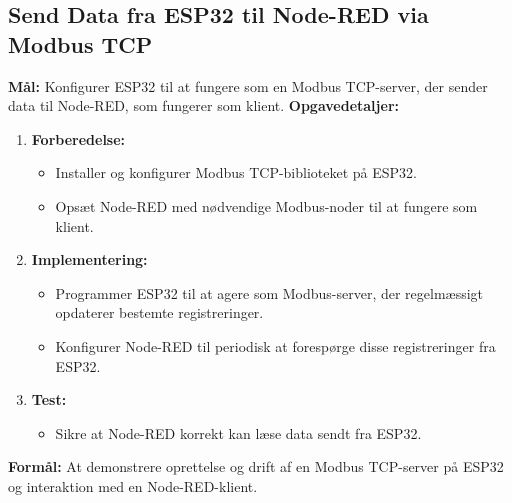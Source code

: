 \documentclass[12pt,a4paper]{book}
\begin{document}
	\subsection*{Send Data fra ESP32 til Node-RED via Modbus TCP}
	\textbf{Mål:} Konfigurer ESP32 til at fungere som en Modbus TCP-server, der sender data til Node-RED, som fungerer som klient.
	\newline\newline\noindent
	\textbf{Opgavedetaljer:}
	\begin{enumerate}
		\item \textbf{Forberedelse:}
		\begin{itemize}
			\item Installer og konfigurer Modbus TCP-biblioteket på ESP32.
			\item Opsæt Node-RED med nødvendige Modbus-noder til at fungere som klient.
		\end{itemize}
		\item \textbf{Implementering:}
		\begin{itemize}
			\item Programmer ESP32 til at agere som Modbus-server, der regelmæssigt opdaterer bestemte registreringer.
			\item Konfigurer Node-RED til periodisk at forespørge disse registreringer fra ESP32.
		\end{itemize}
		\item \textbf{Test:}
		\begin{itemize}
			\item Sikre at Node-RED korrekt kan læse data sendt fra ESP32.
		\end{itemize}
	\end{enumerate}
	\textbf{Formål:} At demonstrere oprettelse og drift af en Modbus TCP-server på ESP32 og interaktion med en Node-RED-klient.
	
\end{document}

